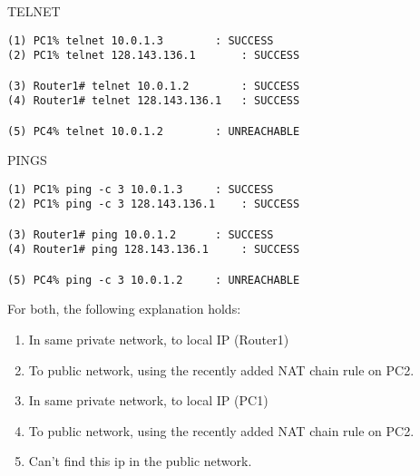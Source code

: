 TELNET
\begin{lstlisting}
(1) PC1% telnet 10.0.1.3		: SUCCESS
(2) PC1% telnet 128.143.136.1		: SUCCESS

(3) Router1# telnet 10.0.1.2		: SUCCESS
(4) Router1# telnet 128.143.136.1	: SUCCESS

(5) PC4% telnet 10.0.1.2		: UNREACHABLE
\end{lstlisting}

PINGS
\begin{lstlisting}
(1) PC1% ping -c 3 10.0.1.3		: SUCCESS
(2) PC1% ping -c 3 128.143.136.1	: SUCCESS

(3) Router1# ping 10.0.1.2		: SUCCESS
(4) Router1# ping 128.143.136.1		: SUCCESS

(5) PC4% ping -c 3 10.0.1.2		: UNREACHABLE
\end{lstlisting}

For both, the following explanation holds:
\begin{enumerate}
\item In same private network, to local IP (Router1)
\item To public network, using the recently added NAT chain rule on PC2.
\item In same private network, to local IP (PC1)
\item To public network, using the recently added NAT chain rule on PC2.
\item Can't find this ip in the public network.
\end{enumerate}
